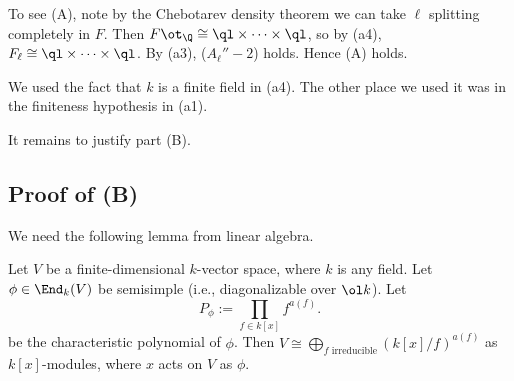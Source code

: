 To see (A), note by the Chebotarev density theorem we can take $\ell$ splitting completely in $F$. Then $F\ot_{\Q}\cong \ql\times \cdots \times \ql$, so by (a4), $F_{\ell}\cong \ql\times \cdots \times \ql$. By (a3), ($A_{\ell}''-2$) holds. Hence (A) holds. %

We used the fact that $k$ is a finite field in (a4). The other place we used it was in the finiteness hypothesis in (a1). %

It remains to justify part (B). 
\subsection{Proof of (B)}
We need the following lemma from linear algebra.
\begin{lem}
Let $V$ be a finite-dimensional $k$-vector space, where $k$ is any field. Let $\phi\in \End_k(V)$ be semisimple (i.e., diagonalizable over $\ol k$). Let 
\[
P_{\phi}:=\prod_{f\in k[x]}f^{a(f)}.
\]
 be the characteristic polynomial of $\phi$. 
Then $V\cong \bigoplus_{f\text{ irreducible}} (k[x]/f)^{a(f)}$ as $k[x]$-modules, where $x$ acts on $V$ as $\phi$.
\end{lem}

